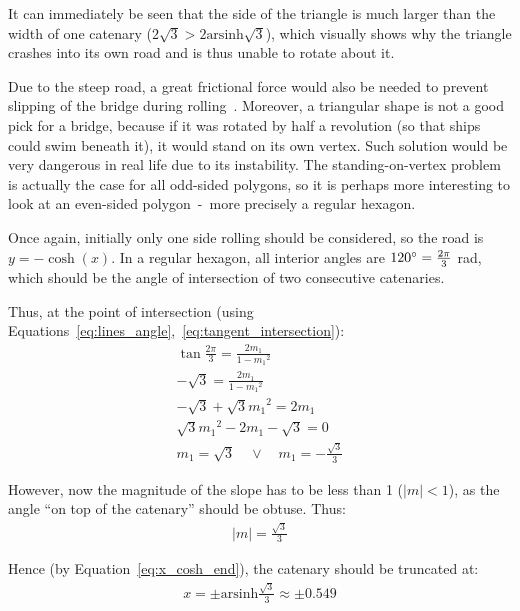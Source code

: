 \documentclass[12pt]{article}
\begin{document}
        It can immediately be seen that the side of the triangle is much larger than the width of one catenary ($2\sqrt{3} > 2\text{arsinh}\sqrt{3}$), which visually shows why the triangle crashes into its own road and is thus unable to rotate about it.

        Due to the steep road, a great frictional force would also be needed to prevent slipping of the bridge during rolling~\cite{bridge_wolfram}. Moreover, a triangular shape is not a good pick for a bridge, because if it was rotated by half a revolution (so that ships could swim beneath it), it would stand on its own vertex. Such solution would be very dangerous in real life due to its instability. The standing-on-vertex problem is actually the case for all odd-sided polygons, so it is perhaps more interesting to look at an even-sided polygon~-~more precisely a regular hexagon.

        Once again, initially only one side rolling should be considered, so the road is $y = -\cosh(x)$. In a regular hexagon, all interior angles are $120\degree = \frac{2\pi}{3}$ rad, which should be the angle of intersection of two consecutive catenaries. 
        
        Thus, at the point of intersection (using Equations~\ref{eq:lines_angle},~\ref{eq:tangent_intersection}):
        \begin{align}
            \tan \frac{2\pi}{3} = \frac{2m_1}{1 - {m_1}^2} \\
            - \sqrt{3} = \frac{2m_1}{1 - {m_1}^2} \\
            -\sqrt{3} + \sqrt{3}{m_1}^2 = 2m_1 \\
            \sqrt{3}{m_1}^2 - 2m_1 - \sqrt{3} = 0 \\
            m_1 = \sqrt{3} \quad \lor \quad m_1 = - \frac{\sqrt{3}}{3}
        \end{align}

        However, now the magnitude of the slope has to be less than 1 ($|m|<1$), as the angle ``on top of the catenary'' should be obtuse. Thus:
        \begin{align}
            |m| = \frac{\sqrt{3}}{3} 
        \end{align}

        Hence (by Equation~\ref{eq:x_cosh_end}), the catenary should be truncated at:
        \begin{align}
            x = \pm \text{arsinh}\frac{\sqrt{3}}{3} \approx \pm 0.549
        \end{align}
\end{document}
